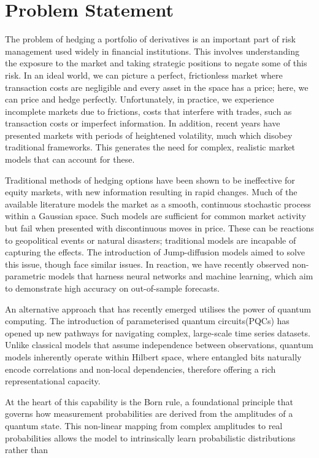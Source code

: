 \documentclass[12pt]{article}
\newcommand{\newp}
    {
    \vskip 0.5cm 
  }
\numberwithin{equation}{section}
\begin{document}
\section{Problem Statement}
The problem of hedging a portfolio of derivatives is an important part of 
risk management used widely in financial institutions. This involves understanding 
the exposure to the market and taking strategic positions to negate some of this 
risk. In an ideal world, we can picture a perfect, 
frictionless market where transaction costs are negligible and every asset in 
the space has a price; here, we can price and hedge perfectly. Unfortunately, in 
practice, we experience incomplete markets due to frictions, costs that interfere 
with trades, such as transaction costs or imperfect information. In addition, recent 
years have presented markets with periods of heightened volatility, much which disobey 
traditional frameworks. This generates the need for complex, realistic market 
models that can account for these.
\newp
Traditional methods of hedging options have been shown to be ineffective for equity 
markets, with new information resulting in rapid changes. Much of the available 
literature models the market as a smooth, continuous stochastic process within 
a Gaussian space. Such models are sufficient for common market activity but fail 
when presented with discontinuous moves in price. These can be reactions to 
geopolitical events or natural disasters; traditional
models are incapable of capturing the effects. The introduction of Jump-diffusion 
models aimed to solve this issue, though face similar issues. In reaction, we have 
recently observed non-parametric models that harness neural networks and machine 
learning, which aim to demonstrate high accuracy on out-of-sample forecasts.
\newp
An alternative approach that has recently emerged utilises the power of 
quantum computing.
The introduction of parameterised quantum circuits(PQCs) has 
opened up new pathways for navigating complex, large-scale time series datasets.
Unlike classical models that assume independence between observations, quantum 
models inherently operate within Hilbert space, where entangled bits naturally 
encode correlations and non-local dependencies, therefore offering a rich representational 
capacity.
\newp 
At the heart of this capability is the Born rule, a foundational principle that 
governs how measurement probabilities are derived from the amplitudes of a 
quantum state. This non-linear mapping from complex amplitudes to real probabilities 
allows the model to intrinsically learn probabilistic distributions rather than 
\end{document}
